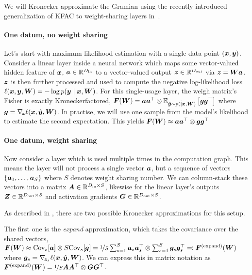 
We will Kronecker-approximate the Gramian using the recently introduced generalization of KFAC to weight-sharing layers in~\citet{eschenhagen2023kroneckerfactored}.

\paragraph{One datum, no weight sharing} Let's start with maximum likelihood estimation with a single data point $({\bm{x}}, {\bm{y}})$.
Consider a linear layer inside a neural network which maps some vector-valued hidden feature of ${\bm{x}}$, ${\bm{a}} \in {\mathbb{R}}^{D_{\text{in}}}$ to a vector-valued output ${\bm{z}} \in {\mathbb{R}}^{D_{\text{out}}}$ via ${\bm{z}} = {\bm{W}} {\bm{a}}$.
${\bm{z}}$ is then further processed and used to compute the negative log-likelihood loss $\ell({\bm{x}}, {\bm{y}}, {\bm{W}}) = - \log p({\bm{y}} \mid {\bm{x}}, {\bm{W}})$.
For this single-usage layer, the weigh matrix's Fisher is exactly Kroneckerfactored, ${\bm{F}}({\bm{W}}) = {\bm{a}} {\bm{a}}^{\top} \otimes \mathbb{E}_{\hat{{\bm{y}}} \sim p(\dot \mid {\bm{x}}, {\bm{W}})}\left[ {\bm{g}} {\bm{g}}^{\top} \right]$ where ${\bm{g}} = \nabla_{\!{{\bm{z}}}} \ell({\bm{x}}, \hat{{\bm{y}}}, {\bm{W}})$.
In practise, we will use one sample from the model's likelihood to estimate the second expectation.
This yields ${\bm{F}}({\bm{W}}) \approx {\bm{a}} {\bm{a}}^{\top} \otimes {\bm{g}} {\bm{g}}^{\top}$

\paragraph{One datum, weight sharing} Now consider a layer which is used
multiple times in the computation graph. This means the layer will not process a
single vector ${\bm{a}}$, but a sequence of vectors $\left\{ {\bm{a}}_1, \dots, {\bm{a}}_S
\right\}$ where $S$ denotes weight sharing number. We can column-stack these
vectors into a matrix ${\bm{A}} \in {\mathbb{R}}^{D_{\text{in}}\times S}$, likewise for the
linear layer's outputs ${\bm{Z}} \in {\mathbb{R}}^{D_{\text{out}}\times S}$ and activation
gradients ${\bm{G}} \in {\mathbb{R}}^{D_{\text{out}} \times S}$.

As described in \citet{eschenhagen2023kroneckerfactored}, there are two possible Kronecker approximations for this setup.

The first one is the \emph{expand} approximation, which takes the covariance over the shared vectors, ${\bm{F}}({\bm{W}}) \approx \mathrm{Cov}_s[{\bm{a}}] \otimes S \mathrm{Cov}_s[{\bm{g}}] = \nicefrac{1}{S} \sum_{s=1}^S {\bm{a}}_s {\bm{a}}_s^{\top} \otimes \sum_{s=1}^S {\bm{g}}_s {\bm{g}}_s^{\top} \eqqcolon {\bm{F}}^{(\text{expand})}({\bm{W}})$ where ${\bm{g}}_s = \nabla_{\!{{\bm{z}}_s}} \ell({\bm{x}}, \hat{{\bm{y}}}, {\bm{W}})$.
We can express this in matrix notation as ${\bm{F}}^{(\text{expand})}({\bm{W}}) = \nicefrac{1}{S} {\bm{A}} {\bm{A}}^{\top} \otimes {\bm{G}} {\bm{G}}^{\top}$.

